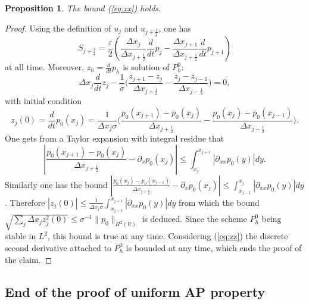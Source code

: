\documentclass[a4paper,french,english,10pt]{article}
\newcommand\eps{\varepsilon}
\newtheorem{proposition}[theorem]{Proposition}
\begin{document}
\begin{proposition}\label{pro:H1}
The bound (\ref{eq:xx}) holds.
\end{proposition}

\begin{proof}

Using the definition of $u_j$
and $u_{j+\frac12 }$, one has 
$$
S_{j+\frac12 }=\frac{\eps}{2}\left( \frac{ \Delta x_j}{\Delta x_{j+\frac12}}
\frac{d}{dt} p_j - \frac{\Delta x_{j+1}}{\Delta x_{j+\frac12}} \frac{d}{dt} p_{j+1} \right)
$$
 at all time.
Moreover, $z_h=\frac{d}{dt} p_h$ is solution of
$P_h^0$:
$$
\Delta x_j\frac{d}{dt} z_j -\frac{1}{\sigma } \bigg(
\frac{z_{j+1}-z_j}{\Delta x_{j+\frac12 }}-\frac{z_j -z_{j-1}}{\Delta
x_{j-\frac12 }}\bigg)=0,
$$
with initial condition
\begin{equation}\label{eq:zz}
z_j(0)=\frac{d}{dt} p_0(x_j)=
\frac1 {\Delta x_j \sigma } \bigg(
\frac{p_0(x_{j+1})-p_0(x_j)}{\Delta x_{j+\frac12 }}-\frac{p_0(x_j)
 -p_0(x_{j-1}  )}{\Delta
x_{j-\frac12 }}\bigg).
\end{equation}
One gets from a Taylor expansion with integral residue
that
$$
\left|
\frac{p_0( x_{j+1}) -p_0(x_j)}{\Delta x_{j+\frac12 }}- 
\partial_x p _0(x_j)
\right|\leq 
 \int_{x_j}^{x_{j+1}  } \left|\partial_{xx}p_0(y)   \right| dy .$$ 
Similarly one has the bound
$
\left|
 \frac{p_0( x_{j}) -p_0(x_{j-1})}{\Delta x_{j+\frac12 }}-
\partial_x p _0(x_j)\right|
\leq
 \int_{x_{j-1}}^{x_{j}  } \left|\partial_{xx}p_0(y)   \right| dy $.
Therefore $|z_j(0)|\leq
\frac1 {\Delta x_j \sigma }  \int_{x_{j-1}}^{x_{j+1}  } \left|\partial_{xx}p_0(y)  
 \right| dy $ from which the bound
$
\sqrt{ \sum_j \Delta x_j z_j^2(0) }
\leq \sigma^{-1}\|p_0\|_{H^2(\mathbb{R})}$
is deduced.
Since the scheme $P_h^0$ being stable in $L^2$, this bound is true at any time.
Considering (\ref{eq:zz}) the discrete second derivative
attached to $P_h^0$ is bounded at any time, which ends the proof
of the claim.
\end{proof} 

\subsection{End of the proof of uniform AP property}
\end{document}
